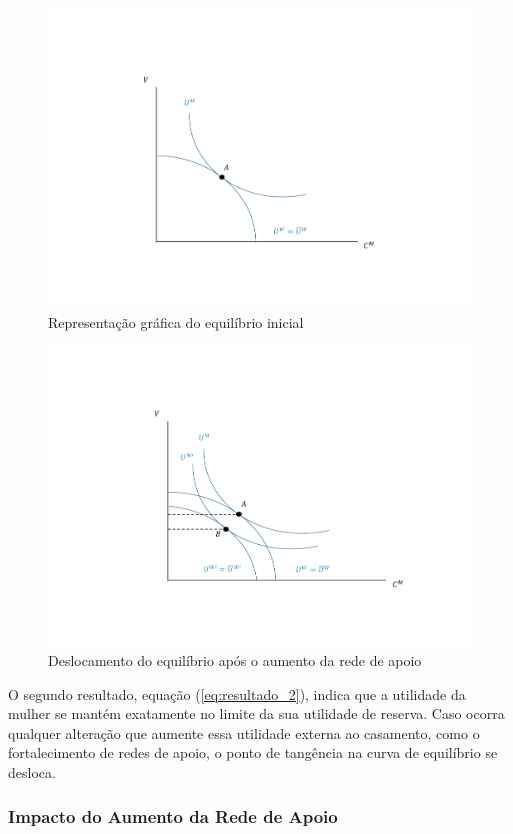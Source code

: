 \begin{figure} 
    \centering
    \includegraphics[width=0.8\linewidth]{relatorios/close_elections/graficos/micro1.pdf}
    \caption{Representação gráfica do equilíbrio inicial}
    \label{fig:micro1}
\end{figure}

\begin{figure} 
    \centering
    \includegraphics[width=0.8\linewidth]{relatorios/close_elections/graficos/micro2.pdf}
    \caption{Deslocamento do equilíbrio após o aumento da rede de apoio}
    \label{fig:micro2}
\end{figure}

O segundo resultado, equação (\ref{eq:resultado_2}), indica que a utilidade da mulher se mantém exatamente no limite da sua utilidade de reserva. Caso ocorra qualquer alteração que aumente essa utilidade externa ao casamento, como o fortalecimento de redes de apoio, o ponto de tangência na curva de equilíbrio se desloca.

\subsubsection{Impacto do Aumento da Rede de Apoio}

